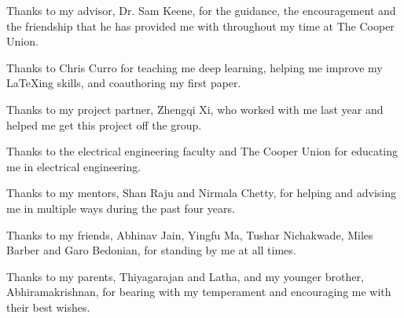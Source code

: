 \begin{acknowledgements}
		
	Thanks to my advisor, Dr. Sam Keene, for the guidance, the encouragement and the friendship that he has provided me with throughout my time at The Cooper Union. 
		
	\smallskip
		
	Thanks to Chris Curro for teaching me deep learning, helping me improve my \LaTeX ing skills, and coauthoring my first paper. 
		
	\smallskip
		
	Thanks to my project partner, Zhengqi Xi, who worked with me last year and helped me get this project off the group. 
		
	\smallskip
		
	Thanks to the electrical engineering faculty and The Cooper Union for educating me in electrical engineering.
		
	\smallskip
		
	Thanks to my mentors, Shan Raju and Nirmala Chetty, for helping and advising me in multiple ways during the past four years. 
		
	\smallskip
		
	Thanks to my friends, Abhinav Jain, Yingfu Ma, Tushar Nichakwade, Miles Barber and Garo Bedonian, for standing by me at all times. 
		
	\smallskip
		
	Thanks to my parents, Thiyagarajan and Latha, and my younger brother, Abhiramakrishnan, for bearing with my temperament and encouraging me with their best wishes. 
		
			
\end{acknowledgements}